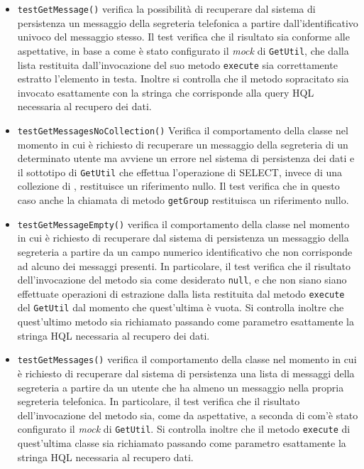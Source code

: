 \begin{itemize}
\begin{itemize}
\item \texttt{testGetMessage()} verifica la possibilità di recuperare dal sistema di persistenza un messaggio della segreteria telefonica a partire dall'identificativo univoco del messaggio stesso. Il test verifica che il risultato sia conforme alle aspettative, in base a come è stato configurato il \textit{mock} di \texttt{GetUtil}, che dalla lista restituita dall'invocazione del suo metodo \texttt{execute} sia correttamente estratto l'elemento in testa. Inoltre si controlla che il metodo sopracitato sia invocato esattamente con la stringa che corrisponde alla query HQL necessaria al recupero dei dati.

\item \texttt{testGetMessagesNoCollection()} Verifica il comportamento della classe nel momento in cui è richiesto di recuperare un messaggio della segreteria di un determinato utente ma avviene un errore nel sistema di persistenza dei dati e il sottotipo di \texttt{GetUtil} che effettua l'operazione di SELECT, invece di una collezione di , restituisce un riferimento nullo. Il test verifica che in questo caso anche la chiamata di metodo \texttt{getGroup} restituisca un riferimento nullo.

\item \texttt{testGetMessageEmpty()} verifica il comportamento della classe nel momento in cui è richiesto di recuperare dal sistema di persistenza un messaggio della segreteria a partire da un campo numerico identificativo che non corrisponde ad alcuno dei messaggi presenti. In particolare, il test verifica che il risultato dell'invocazione del metodo sia come desiderato \texttt{null}, e che non siano siano effettuate operazioni di estrazione dalla lista restituita dal metodo \texttt{execute} del \texttt{GetUtil} dal momento che quest'ultima è vuota.
Si controlla inoltre che quest'ultimo metodo sia richiamato passando come parametro esattamente la stringa HQL necessaria al recupero dei dati.

\item \texttt{testGetMessages()} verifica il comportamento della classe nel momento in cui è richiesto di recuperare dal sistema di persistenza una lista di messaggi della segreteria a partire da un utente che ha almeno un messaggio nella propria segreteria telefonica. In particolare, il test verifica che il risultato dell'invocazione del metodo sia, come da aspettative, a seconda di com'è stato configurato il \textit{mock} di \texttt{GetUtil}. Si controlla inoltre che il metodo \texttt{execute} di quest'ultima classe sia richiamato passando come parametro esattamente la stringa HQL necessaria al recupero dati.


\end{itemize}
\end{itemize}
